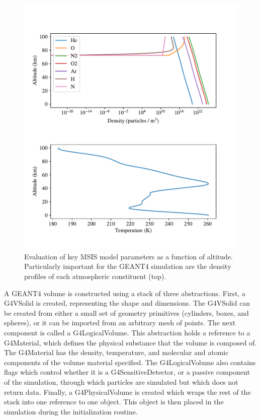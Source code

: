 \begin{figure}[p]
\label{msis_eval}
\includegraphics[width=1.0\textwidth]{figures/chapter_3/msis_eval/msis_eval}
\caption{Evaluation of key MSIS model parameters as a function of altitude. Particularly important for the GEANT4 simulation are the density profiles of each atmospheric constituent (top).}
\end{figure}

A GEANT4 volume is constructed using a stack of three abstractions. First, a G4VSolid is created, representing the shape and dimensions. The G4VSolid can be created from either a small set of geometry primitives (cylinders, boxes, and spheres), or it can be imported from an arbitrary mesh of points. The next component is called a G4LogicalVolume. This abstraction holds a reference to a G4Material, which defines the physical substance that the volume is composed of. The G4Material has the density, temperature, and molecular and atomic components of the volume material specified. The G4LogicalVolume also contains flags which control whether it is a G4SensitiveDetector, or a passive component of the simulation, through which particles are simulated but which does not return data. Finally, a G4PhysicalVolume is created which wraps the rest of the stack into one reference to one object. This object is then placed in the simulation during the initialization routine. 

